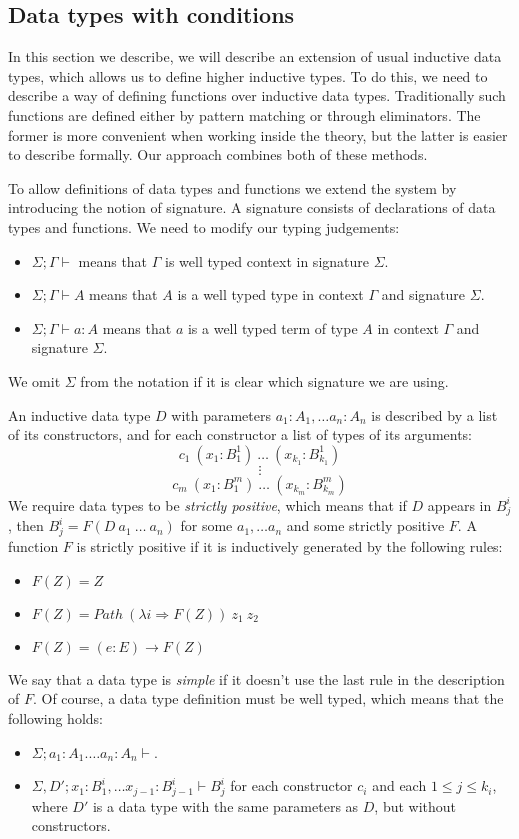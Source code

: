 \documentclass{amsart}
\theoremstyle{definition}
\theoremstyle{remark}
\newcommand{\red}{\Rightarrow}
\numberwithin{figure}{section}
\begin{document}
\subsection{Data types with conditions}

In this section we describe, we will describe an extension of usual inductive data types, which allows us to define higher inductive types.
To do this, we need to describe a way of defining functions over inductive data types.
Traditionally such functions are defined either by pattern matching or through eliminators.
The former is more convenient when working inside the theory, but the latter is easier to describe formally.
Our approach combines both of these methods.

To allow definitions of data types and functions we extend the system by introducing the notion of signature.
A signature consists of declarations of data types and functions.
We need to modify our typing judgements:
\begin{itemize}
    \item $\Sigma; \Gamma \vdash$ means that $\Gamma$ is well typed context in signature $\Sigma$.
    \item $\Sigma; \Gamma \vdash A$ means that $A$ is a well typed type in context $\Gamma$ and signature $\Sigma$.
    \item $\Sigma; \Gamma \vdash a : A$ means that $a$ is a well typed term of type $A$ in context $\Gamma$ and signature $\Sigma$.
\end{itemize}
We omit $\Sigma$ from the notation if it is clear which signature we are using.

An inductive data type $D$ with parameters $a_1 : A_1, \ldots a_n : A_n$ is described by a list of its constructors, and for each constructor a list of types of its arguments:
\[ c_1\ (x_1 : B^1_1)\ \ldots\ (x_{k_1} : B^1_{k_1}) \]
\[ \vdots \]
\[ c_m\ (x_1 : B^m_1)\ \ldots\ (x_{k_m} : B^m_{k_m}) \]
We require data types to be \emph{strictly positive}, which means that if $D$ appears in $B^i_j$, then $B^i_j = F(D\ a_1\ \ldots\ a_n)$ for some $a_1, \ldots a_n$ and some strictly positive $F$.
A function $F$ is strictly positive if it is inductively generated by the following rules:
\begin{itemize}
    \item $F(Z) = Z$
    \item $F(Z) = Path\ (\lambda i \red F(Z))\ z_1\ z_2$
    \item $F(Z) = (e : E) \to F(Z)$
\end{itemize}
We say that a data type is \emph{simple} if it doesn't use the last rule in the description of $F$.
Of course, a data type definition must be well typed, which means that the following holds:
\begin{itemize}
    \item $\Sigma; a_1 : A_1. \ldots a_n : A_n \vdash$.
    \item $\Sigma, D'; x_1 : B^i_1, \ldots x_{j-1} : B^i_{j-1} \vdash B^i_j$ for each constructor $c_i$ and each $1 \leq j \leq k_i$, where $D'$ is a data type with the same parameters as $D$, but without constructors.
\end{itemize}
\end{document}
